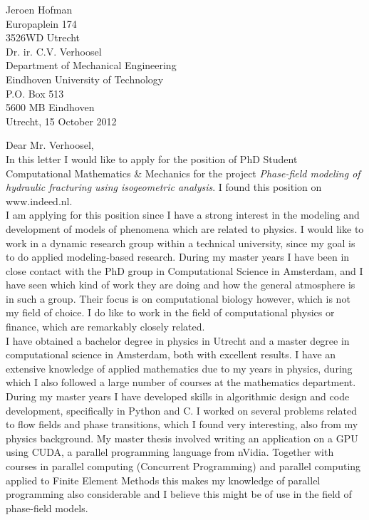 \documentclass[11pt,a4paper]{article}
\begin{document}
Jeroen Hofman\\
Europaplein 174\\
3526WD Utrecht\\


Dr. ir. C.V. Verhoosel\\
Department of Mechanical Engineering\\
Eindhoven University of Technology\\
P.O. Box 513\\
5600 MB Eindhoven\\

Utrecht, 15 October 2012\\
\vspace{15pt}

Dear Mr. Verhoosel,\\

In this letter I would like to apply for the position of PhD Student Computational Mathematics \& Mechanics for the project \emph{Phase-field modeling of hydraulic fracturing using isogeometric analysis}. I found this position on www.indeed.nl.\\

I am applying for this position since I have a strong interest in the modeling and development of models of phenomena which are related to physics. I would like to work in a dynamic research group within a technical university, since my goal is to do applied modeling-based research. During my master years I have been in close contact with the PhD group in Computational Science in Amsterdam, and I have seen which kind of work they are doing and how the general atmosphere is in such a group. Their focus is on computational biology however, which is not my field of choice. I do like to work in the field of computational physics or finance, which are remarkably closely related.\\

I have obtained a bachelor degree in physics in Utrecht and a master degree in computational science in Amsterdam, both with excellent results. I have an extensive knowledge of applied mathematics due to my years in physics, during which I also followed a large number of courses at the mathematics department. During my master years I have developed skills in algorithmic design and code development, specifically in Python and C. I worked on several problems related to flow fields and phase transitions, which I found very interesting, also from my physics background. My master thesis involved writing an application on a GPU using CUDA, a parallel programming language from nVidia. Together with courses in parallel computing (Concurrent Programming) and parallel computing applied to Finite Element Methods this makes my knowledge of parallel programming also considerable and I believe this might be of use in the field of phase-field models. \\
\end{document}
